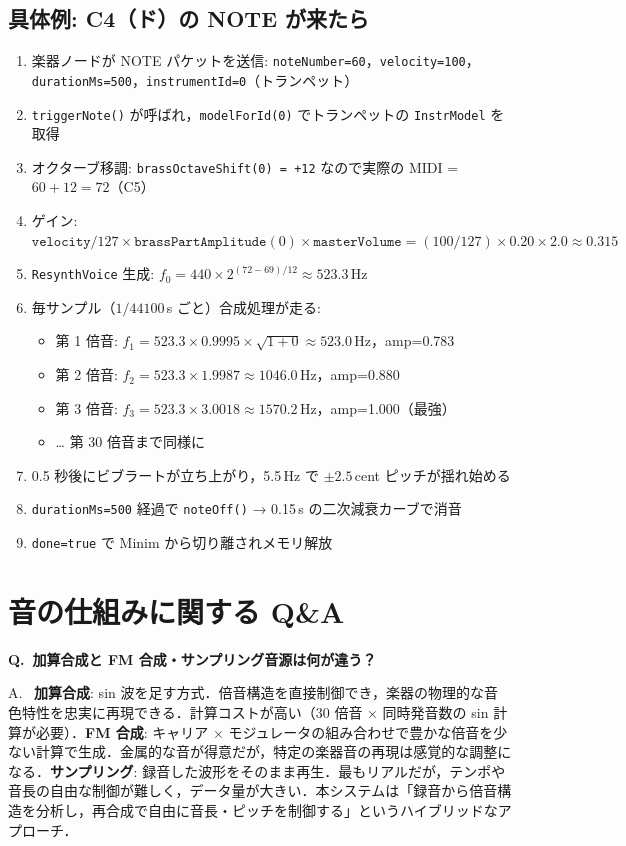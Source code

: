 \documentclass[uplatex,dvipdfmx,a4paper,10pt]{jsarticle}
\newcommand{\QA}[2]{%
  \par\noindent\textbf{\textcolor{qcolor}{Q.~#1}}%
  \par\noindent\textcolor{acolor}{A.~#2}\medskip%
}
\begin{document}
\subsection{具体例: C4（ド）の NOTE が来たら}

\begin{enumerate}
  \item 楽器ノードが NOTE パケットを送信: \texttt{noteNumber=60}，\texttt{velocity=100}，\texttt{durationMs=500}，\texttt{instrumentId=0}（トランペット）
  \item \texttt{triggerNote()} が呼ばれ，\texttt{modelForId(0)} でトランペットの \texttt{InstrModel} を取得
  \item オクターブ移調: \texttt{brassOctaveShift(0) = +12} なので実際の MIDI = $60 + 12 = 72$（C5）
  \item ゲイン: $\texttt{velocity}/127 \times \texttt{brassPartAmplitude}(0) \times \texttt{masterVolume} = (100/127) \times 0.20 \times 2.0 \approx 0.315$
  \item \texttt{ResynthVoice} 生成: $f_0 = 440 \times 2^{(72-69)/12} \approx 523.3$\,Hz
  \item 毎サンプル（$1/44100$\,s ごと）合成処理が走る:
    \begin{itemize}
      \item 第 1 倍音: $f_1 = 523.3 \times 0.9995 \times \sqrt{1+0} \approx 523.0$\,Hz，amp=0.783
      \item 第 2 倍音: $f_2 = 523.3 \times 1.9987 \approx 1046.0$\,Hz，amp=0.880
      \item 第 3 倍音: $f_3 = 523.3 \times 3.0018 \approx 1570.2$\,Hz，amp=1.000（最強）
      \item … 第 30 倍音まで同様に
    \end{itemize}
  \item 0.5 秒後にビブラートが立ち上がり，5.5\,Hz で $\pm2.5$\,cent ピッチが揺れ始める
  \item \texttt{durationMs=500} 経過で \texttt{noteOff()} → 0.15\,s の二次減衰カーブで消音
  \item \texttt{done=true} で Minim から切り離されメモリ解放
\end{enumerate}

\section{音の仕組みに関する Q\&A}

\QA{加算合成と FM 合成・サンプリング音源は何が違う？}{
\textbf{加算合成}: sin 波を足す方式．倍音構造を直接制御でき，楽器の物理的な音色特性を忠実に再現できる．計算コストが高い（30 倍音 $\times$ 同時発音数の sin 計算が必要）．\textbf{FM 合成}: キャリア $\times$ モジュレータの組み合わせで豊かな倍音を少ない計算で生成．金属的な音が得意だが，特定の楽器音の再現は感覚的な調整になる．\textbf{サンプリング}: 録音した波形をそのまま再生．最もリアルだが，テンポや音長の自由な制御が難しく，データ量が大きい．本システムは「録音から倍音構造を分析し，再合成で自由に音長・ピッチを制御する」というハイブリッドなアプローチ．}
\end{document}
